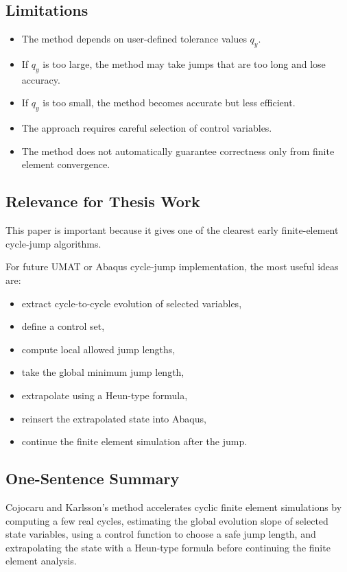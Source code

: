 ﻿\documentclass[11pt,a4paper]{article}
\begin{document}
\subsection{Limitations}

\begin{itemize}[leftmargin=*]
    \item The method depends on user-defined tolerance values $q_y$.
    \item If $q_y$ is too large, the method may take jumps that are too long and lose accuracy.
    \item If $q_y$ is too small, the method becomes accurate but less efficient.
    \item The approach requires careful selection of control variables.
    \item The method does not automatically guarantee correctness only from finite element convergence.
\end{itemize}

\subsection{Relevance for Thesis Work}

This paper is important because it gives one of the clearest early finite-element cycle-jump algorithms.

For future UMAT or Abaqus cycle-jump implementation, the most useful ideas are:

\begin{itemize}[leftmargin=*]
    \item extract cycle-to-cycle evolution of selected variables,
    \item define a control set,
    \item compute local allowed jump lengths,
    \item take the global minimum jump length,
    \item extrapolate using a Heun-type formula,
    \item reinsert the extrapolated state into Abaqus,
    \item continue the finite element simulation after the jump.
\end{itemize}

\subsection{One-Sentence Summary}

Cojocaru and Karlsson's method accelerates cyclic finite element simulations by computing a few real cycles, estimating the global evolution slope of selected state variables, using a control function to choose a safe jump length, and extrapolating the state with a Heun-type formula before continuing the finite element analysis.
\end{document}
